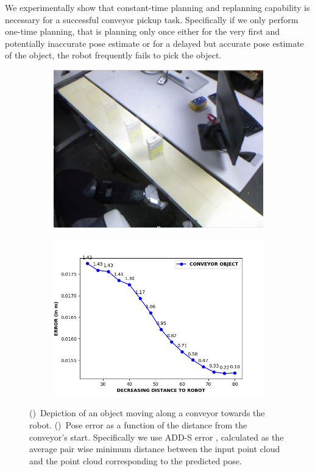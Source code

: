 \documentclass[a4paper]{report}
\begin{document}
%
We experimentally show that constant-time planning and replanning capability is necessary for a successful conveyor pickup task. Specifically if we only perform one-time planning, that is planning only once either for the very first and potentially inaccurate pose estimate or for a delayed but accurate pose estimate of the object, the robot frequently fails to pick the object.
\begin{figure}[t]
    \centering
    \begin{subfigure}{.49\textwidth}
        \includegraphics[width=\textwidth]{object_blur}
        \caption{}
        \label{fig:obj1}
    \end{subfigure}
    \begin{subfigure}{0.49\textwidth}
        \includegraphics[width=\textwidth]{pose_error_plot}
        \caption{}
        \label{fig:obj2}
    \end{subfigure}
    \caption{
    \CaptionTextSize
    ()~Depiction of an object moving along a conveyor towards the robot.
    ()~Pose error as a function of the distance from the conveyor's start. Specifically we use ADD-S error \cite{add_metric},
    calculated as the average pair wise minimum distance between the input point cloud and the point cloud corresponding to the predicted pose.
    }
    \label{fig:pose_sequence}
\end{figure}
\end{document}
